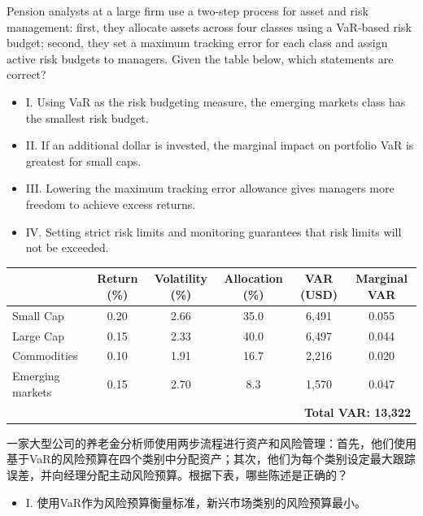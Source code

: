 \documentclass{article}
\newcounter{question} %
\begin{document}
\begin{question}
    Pension analysts at a large firm use a two-step process for asset and risk management: first, they allocate assets across four classes using a VaR-based risk budget; second, they set a maximum tracking error for each class and assign active risk budgets to managers. Given the table below, which statements are correct?  
    \begin{itemize}
        \item I. Using VaR as the risk budgeting measure, the emerging markets class has the smallest risk budget.  
        \item II. If an additional dollar is invested, the marginal impact on portfolio VaR is greatest for small caps.  
        \item III. Lowering the maximum tracking error allowance gives managers more freedom to achieve excess returns.  
        \item IV. Setting strict risk limits and monitoring guarantees that risk limits will not be exceeded.
    \end{itemize}
    \begin{table}[H]
        \centering
        \renewcommand{\arraystretch}{1.2}
        \begin{tabular}{|l|c|c|c|c|c|}
            \hline
            & \textbf{Return (\%)} & \textbf{Volatility (\%)} & \textbf{Allocation (\%)} & \textbf{VAR (USD)} & \textbf{Marginal VAR} \\
            \hline
            Small Cap         & 0.20 & 2.66 & 35.0 & 6,491 & 0.055 \\
            Large Cap         & 0.15 & 2.33 & 40.0 & 6,497 & 0.044 \\
            Commodities       & 0.10 & 1.91 & 16.7 & 2,216 & 0.020 \\
            Emerging markets  & 0.15 & 2.70 & 8.3  & 1,570 & 0.047 \\
            \hline
            \multicolumn{6}{|r|}{\textbf{Total VAR: 13,322}} \\
            \hline
        \end{tabular}
    \end{table}
    一家大型公司的养老金分析师使用两步流程进行资产和风险管理：首先，他们使用基于VaR的风险预算在四个类别中分配资产；其次，他们为每个类别设定最大跟踪误差，并向经理分配主动风险预算。根据下表，哪些陈述是正确的？  
    \begin{itemize}
        \item I. 使用VaR作为风险预算衡量标准，新兴市场类别的风险预算最小。  

\end{itemize}
\end{question}
\end{document}
